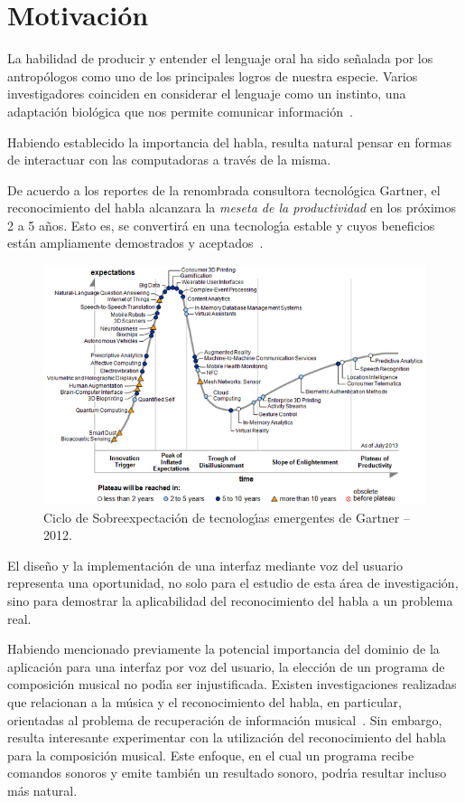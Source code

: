 \section{Motivaci\'on}
\label{sec:motivacion}

La habilidad de producir y entender el lenguaje oral ha sido se\~nalada por los antrop\'ologos
como uno de los principales logros de nuestra especie. Varios investigadores coinciden
en considerar el lenguaje como un instinto, una adaptaci\'on biol\'ogica que nos permite
comunicar \mbox{informaci\'on \cite{GabrielVoice2007}}.

Habiendo establecido la importancia del habla, resulta natural pensar en formas de
interactuar con las computadoras a trav\'es de la misma.

De acuerdo a los reportes de la renombrada consultora tecnol\'ogica Gartner, el reconocimiento
del habla alcanzara la  \emph{meseta de la productividad} en los pr\'oximos 2 a 5 a\~nos. Esto es,
se convertir\'a en una tecnolog{\'\i}a estable y cuyos beneficios est\'an ampliamente demostrados
y \mbox{aceptados \cite{Gartner2012}}.

\begin{figure}[ht]
\centering
\includegraphics[width=0.8\linewidth]{./graphics/gartner.png}
\caption{Ciclo de Sobreexpectaci\'on de tecnolog{\'\i}as emergentes de Gartner -- 2012.}
\label{figure:gartner}
\end{figure}

El dise\~no y la implementaci\'on de una interfaz mediante voz del usuario representa
una oportunidad, no solo para el estudio de esta \'area de investigaci\'on, sino para
demostrar la aplicabilidad del reconocimiento del habla a un problema real.

Habiendo mencionado previamente la potencial importancia del dominio de la aplicaci\'on
para una interfaz por voz del usuario, la elecci\'on de un programa de composici\'on musical
no pod{\'\i}a ser injustificada.
Existen investigaciones realizadas que relacionan a la m\'usica y el reconocimiento
del habla, en particular, orientadas al problema de recuperaci\'on de informaci\'on
\mbox{musical \cite{Goto2004Speech, Schuller2003Hybrid}}.
Sin embargo, resulta interesante experimentar con la utilizaci\'on del reconocimiento
del habla para la composici\'on musical. Este enfoque, en el cual un programa recibe comandos
sonoros y emite tambi\'en un resultado sonoro, podr{\'\i}a resultar incluso m\'as natural.

